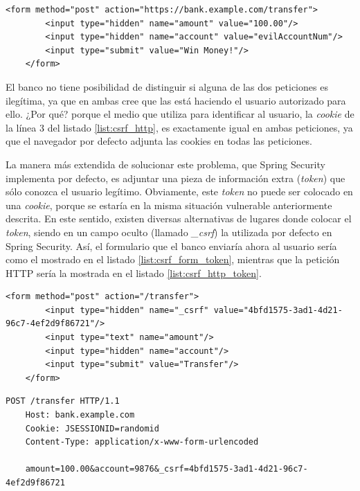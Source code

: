 \documentclass[a4paper]{article}
\begin{document}
	\begin{lstlisting}[caption=Formulario para la transferencia ilegítima de fondos,label=list:csrf_form_evil]
	<form method="post" action="https://bank.example.com/transfer">
		<input type="hidden" name="amount" value="100.00"/>
		<input type="hidden" name="account" value="evilAccountNum"/>
		<input type="submit" value="Win Money!"/>
	</form>
	\end{lstlisting}
	
	El banco no tiene posibilidad de distinguir si alguna de las dos peticiones es ilegítima, ya que en ambas cree que las está haciendo el usuario autorizado para ello. ¿Por qué? porque el medio que utiliza para identificar al usuario, la \emph{cookie} de la línea 3 del listado \ref{list:csrf_http}, es exactamente igual en ambas peticiones, ya que el navegador por defecto adjunta las cookies en todas las peticiones.
	
	La manera más extendida de solucionar este problema, que Spring Security implementa por defecto, es adjuntar una pieza de información extra (\emph{token}) que sólo conozca el usuario legítimo. Obviamente, este \emph{token} no puede ser colocado en una \emph{cookie}, porque se estaría en la misma situación vulnerable anteriormente descrita. En este sentido, existen diversas alternativas de lugares donde colocar el \emph{token}, siendo en un campo oculto (llamado \emph{\_csrf}) la utilizada por defecto en Spring Security. Así, el formulario que el banco enviaría ahora al usuario sería como el mostrado en el listado \ref{list:csrf_form_token}, mientras que la petición HTTP sería la mostrada en el listado \ref{list:csrf_http_token}.
	\\
	
	\begin{lstlisting}[caption=Formulario seguro para la transferencia de fondos,label=list:csrf_form_token]
	<form method="post" action="/transfer">
		<input type="hidden" name="_csrf" value="4bfd1575-3ad1-4d21-96c7-4ef2d9f86721"/>
		<input type="text" name="amount"/>
		<input type="hidden" name="account"/>
		<input type="submit" value="Transfer"/>
	</form>
	\end{lstlisting}
	
	\begin{lstlisting}[caption=Petición HTTP segura para la transferencia de fondos,label=list:csrf_http_token]
	 POST /transfer HTTP/1.1
	Host: bank.example.com
	Cookie: JSESSIONID=randomid
	Content-Type: application/x-www-form-urlencoded
	
	amount=100.00&account=9876&_csrf=4bfd1575-3ad1-4d21-96c7- 4ef2d9f86721
	\end{lstlisting}
	
\end{document}
